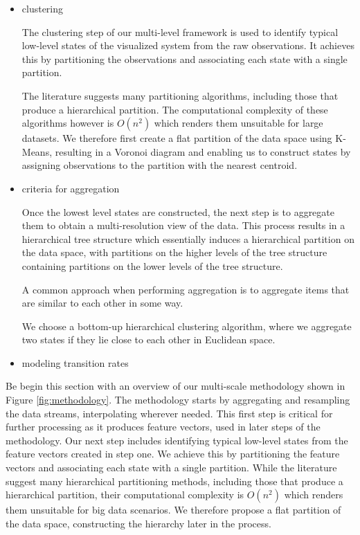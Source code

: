 \begin{itemize}
	\item clustering
	
	The clustering step of our multi-level framework is used to identify typical low-level states
	of the visualized system from the raw observations. It achieves this by partitioning the
	observations and associating each state with a single partition.
	
	The literature suggests many partitioning algorithms, including those that produce a hierarchical 
	partition. The computational complexity of these algorithms however is $O(n^2)$ which renders 
	them unsuitable for large datasets. We therefore first create a flat partition of the data space
	using K-Means, resulting in a Voronoi diagram and enabling us to construct states by assigning
	observations to the partition with the nearest centroid.
	
	\item criteria for aggregation 
	
	Once the lowest level states are constructed, the next step is to aggregate them to obtain a
	multi-resolution view of the data. This process results in a hierarchical tree structure
	which essentially induces a hierarchical partition on the data space, with partitions
	on the higher levels of the tree structure containing partitions on the lower levels of the
	tree structure.
	
	 A common approach when performing aggregation is to aggregate
	items that are similar to each other in some way.
	
	We choose a bottom-up hierarchical clustering algorithm,
	where we aggregate two states if they lie close to each other in Euclidean space.
	
	\item modeling transition rates
\end{itemize}

Be begin this section with an overview of our multi-scale methodology shown in Figure \ref{fig:methodology}.
The methodology starts by aggregating and resampling the data streams, interpolating wherever needed. This
first step is critical for further processing as it produces feature vectors, used in later steps of the
methodology. Our next step includes identifying typical low-level states from the feature vectors
created in step one. We achieve this by partitioning the feature vectors and associating each state
with a single partition. While the literature suggest many hierarchical partitioning methods, including
those that produce a hierarchical partition, their computational complexity is $O(n^2)$ which
renders them unsuitable for big data scenarios. We therefore propose a flat partition of the data space,
constructing the hierarchy later in the process.

